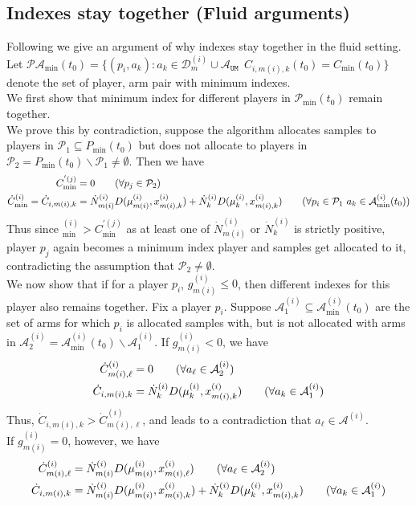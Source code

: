 \documentclass{article}
\begin{document}
\subsection{Indexes stay together (Fluid arguments)}
Following we give an argument of why indexes stay together in the fluid setting. 
Let $\mathcal{PA}_{\min}(t_0) = \{(p_i,a_k) : a_k\in\mathcal{D}^{(i)}_m\cup\mathcal{A}_{\texttt{UM}}\ \ C_{i,m(i),k}(t_0)=C_{\min}(t_0)\}$ denote the set of player, arm pair with minimum indexes.  \\

We first show that minimum index for different players in $\mathcal{P}_{\min}(t_0)$ remain together.\\
We prove this by contradiction, suppose the algorithm allocates samples to players in $ \mathcal{P}_1\subseteq P_{\min}(t_0)$ but does not allocate to players in $\mathcal{P}_2= P_{\min}(t_0)\backslash \mathcal{P}_1\neq \emptyset$.
Then we have
\begin{align*}
    C^{'(j)}_{\min} &=0 \tag{$\forall p_j\in \mathcal{P}_2$}\\
    \dot{C}^{(i)}_{\min} = \dot{C}_{i,m(i),k} &=\dot{N}^{(i)}_{m(i)}D(\mu^{(i)}_{m(i)},x^{(i)}_{m(i),k})+\dot{N}^{(i)}_{k}D(\mu^{(i)}_{k},x^{(i)}_{m(i),k}) \tag{$\forall p_i\in \mathcal{P}_1\ a_k\in\mathcal{A}^{
(i)}_{\min}(t_0)$}
\end{align*}
Thus since $^{(i)}_{\min} >C^{'(j)}_{\min}$ as at least one of $\dot{N}^{(i)}_{m(i)}$ or $\dot{N}^{(i)}_{k}$ is strictly positive, player $p_j$ again becomes a minimum index player and samples get allocated to it, contradicting the assumption that $
\mathcal{P}_2\neq \emptyset$.\\


We now show that if for a player $p_i$,  $g^{(i)}_{m(i)}\leq 0$, then different indexes for this player also remains together. Fix a player $p_i$. Suppose $\mathcal{A}^{(i)}_1\subseteq \mathcal{A}^{(i)}_{\min}(t_0)$ are the set of arms for which $p_i$ is allocated samples with, but is not allocated with arms in $\mathcal{A}^{(i)}_2=\mathcal{A}^{(i)}_{\min}(t_0)\backslash \mathcal{A}^{(i)}_1$.  If $g^{(i)}_{m(i)}<0$, we have
\begin{align*}
     \dot{C}^{(i)}_{m(i),\ell} &=0 \tag{$\forall a_{\ell}\in  \mathcal{A}^{(i)}_2$}\\
   \dot{C}_{i,m(i),k} &=\dot{N}^{(i)}_{k}D(\mu^{(i)}_{k},x^{(i)}_{m(i),k})  \tag{$\forall a_k\in  \mathcal{A}^{(i)}_1$}
\end{align*}
Thus, $\dot{C}_{i,m(i),k} >\dot{C}^{(i)}_{m(i),\ell}$, and leads to a contradiction that $a_{\ell}\in  \mathcal{A}^{(i)}$.\\
If $g^{(i)}_{m(i)}=0$, however, we have
\begin{align*}
     \dot{C}^{(i)}_{m(i),\ell} &=\dot{N}^{(i)}_{m(i)}D(\mu^{(i)}_{m(i)},x^{(i)}_{m(i),\ell}) \tag{$\forall a_{\ell}\in  \mathcal{A}^{(i)}_2$}\\
   \dot{C}_{i,m(i),k} &=\dot{N}^{(i)}_{m(i)}D(\mu^{(i)}_{m(i)},x^{(i)}_{m(i),k})+\dot{N}^{(i)}_{k}D(\mu^{(i)}_{k},x^{(i)}_{m(i),k})  \tag{$\forall a_k\in  \mathcal{A}^{(i)}_1$}
\end{align*}
\end{document}
